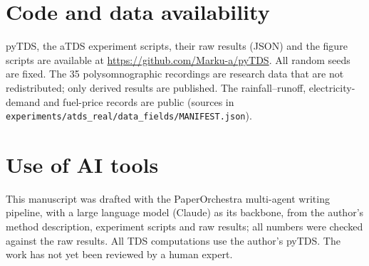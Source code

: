 \documentclass[11pt,a4paper]{article}
\begin{document}
\section*{Code and data availability}
pyTDS, the aTDS experiment scripts, their raw results (JSON) and the figure scripts are available at \url{https://github.com/Marku-a/pyTDS}. All random seeds are fixed. The 35 polysomnographic recordings are research data that are not redistributed; only derived results are published. The rainfall--runoff, electricity-demand and fuel-price records are public (sources in \texttt{experiments/atds\_real/data\_fields/MANIFEST.json}).

\section*{Use of AI tools}
This manuscript was drafted with the PaperOrchestra multi-agent writing pipeline, with a large language model (Claude) as its backbone, from the author's method description, experiment scripts and raw results; all numbers were checked against the raw results. All TDS computations use the author's pyTDS. The work has not yet been reviewed by a human expert.




\end{document}
